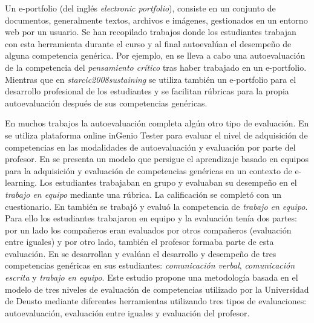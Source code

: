 Un e-portfolio (del inglés \emph{electronic portfolio}), consiste en un conjunto de documentos, generalmente textos, archivos e imágenes, gestionados en un entorno web por un usuario. Se han recopilado trabajos donde los estudiantes trabajan con esta herramienta durante el curso y al final autoevalúan el desempeño de alguna competencia genérica. Por ejemplo, en \cite{arno2011promoting} se lleva a cabo una autoevaluación de la competencia del \emph{pensamiento crítico} tras haber trabajado en un e-portfolio. Mientras que en \emph{starcic2008sustaining} se utiliza también un e-portfolio para el desarrollo profesional de los estudiantes y se facilitan rúbricas para la propia autoevaluación después de sus competencias genéricas.

En muchos trabajos la autoevaluación completa algún otro tipo de evaluación. En \cite{sevilla2012assessment} se utiliza plataforma online inGenio Tester para evaluar el nivel de adquisición de competencias en las modalidades de autoevaluación y evaluación por parte del profesor. En \cite{ficapal2015learning} se presenta un modelo que persigue el aprendizaje basado en equipos para la adquisición y evaluación de competencias genéricas en un contexto de e-learning. Los estudiantes trabajaban en grupo y evaluaban su desempeño en el \emph{trabajo en equipo} mediante una rúbrica. La calificación se completó con un cuestionario. En \cite{khamis2012measurement} también se trabajó y evaluó la competencia de \emph{trabajo en equipo}. Para ello los estudiantes trabajaron en equipo y la evaluación tenía dos partes: por un lado los compañeros eran evaluados por otros compañeros (evaluación entre iguales) y por otro lado, también el profesor formaba parte de esta evaluación. En \cite{barbera2011assessment} se desarrollan y evalúan el desarrollo y desempeño de tres competencias genéricas en sus estudiantes: \emph{comunicación verbal}, \emph{comunicación escrita} y \emph{trabajo en equipo}. Este estudio propone una metodología basada en el modelo de tres niveles de evaluación de competencias utilizado por la Universidad de Deusto mediante diferentes herramientas utilizando tres tipos de evaluaciones: autoevaluación, evaluación entre iguales y evaluación del profesor.

